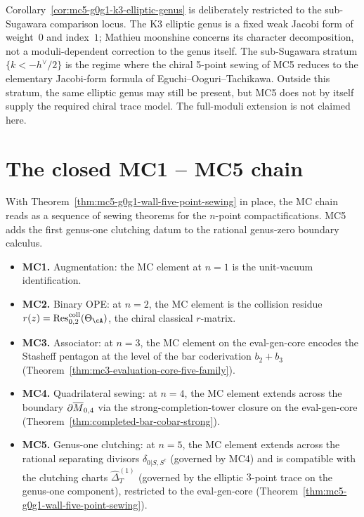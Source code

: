 \begin{remark}
\label{rem:mc5-g0g1-k3-sub-sugawara-scope}
Corollary~\ref{cor:mc5-g0g1-k3-elliptic-genus} is deliberately
restricted to the sub-Sugawara comparison locus. The K3 elliptic genus
is a fixed weak Jacobi form of weight~$0$ and index~$1$; Mathieu
moonshine concerns its character decomposition, not a moduli-dependent
correction to the genus itself.
The sub-Sugawara stratum $\{k < -h^{\vee}/2\}$ is the regime where the
chiral 5-point sewing of MC5 reduces to the elementary Jacobi-form
formula of Eguchi--Ooguri--Tachikawa. Outside this stratum, the same
elliptic genus may still be present, but MC5 does not by itself supply
the required chiral trace model. The full-moduli extension is not
claimed here.
\end{remark}

\section{The closed MC1 -- MC5 chain}
\label{sec:mc5-g0g1-closed-mc-chain}

With Theorem~\ref{thm:mc5-g0g1-wall-five-point-sewing} in place, the
MC chain reads as a sequence of sewing theorems for the $n$-point
compactifications. MC5 adds the first genus-one clutching datum to the
rational genus-zero boundary calculus.

\begin{itemize}
\item \textbf{MC1.} Augmentation: the MC element at $n = 1$ is the
unit-vacuum identification.
\item \textbf{MC2.} Binary OPE: at $n = 2$, the MC element is the
collision residue $r(z) = \mathrm{Res}^{\mathrm{coll}}_{0, 2}(\Theta_{\cA})$,
the chiral classical $r$-matrix.
\item \textbf{MC3.} Associator: at $n = 3$, the MC element on the
eval-gen-core encodes the Stasheff pentagon at the level of the bar
coderivation $b_{2} + b_{3}$
\textup{(}Theorem~\ref{thm:mc3-evaluation-core-five-family}\textup{)}.
\item \textbf{MC4.} Quadrilateral sewing: at $n = 4$, the MC element
extends across the boundary $\partial \overline{M}_{0,4}$ via the
strong-completion-tower closure on the eval-gen-core
\textup{(}Theorem~\ref{thm:completed-bar-cobar-strong}\textup{)}.
\item \textbf{MC5.} Genus-one clutching: at $n = 5$, the MC element
extends across the rational separating divisors $\delta_{0|S, S^c}$
\textup{(}governed by MC4\textup{)} and is compatible with the clutching
charts $\widehat{\Delta}^{(1)}_{T}$ \textup{(}governed by the elliptic
$3$-point trace on the genus-one component\textup{)}, restricted to the eval-gen-core
\textup{(}Theorem~\ref{thm:mc5-g0g1-wall-five-point-sewing}\textup{)}.
\end{itemize}

